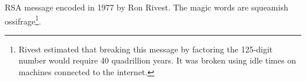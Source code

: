 \newline
\vfill
\begin{citat}{RSA message encoded in 1977 by Ron Rivest.}
The magic words are squeamish ossifrage\footnote{Rivest estimated that breaking this message by factoring the 125-digit number would require 40 quadrillion years. It was broken using idle times on machines connected to the internet.}.
\end{citat}